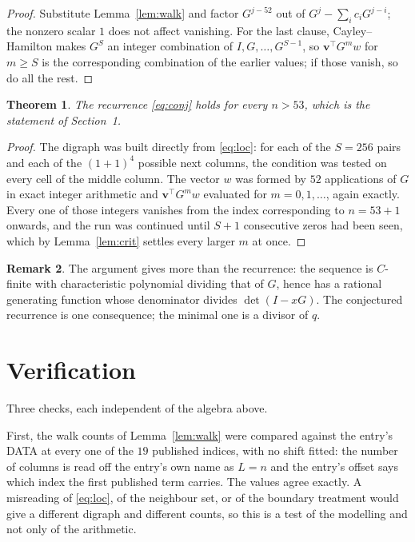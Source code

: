 \documentclass[11pt,a4paper]{article}
\theoremstyle{plain}
\newtheorem{theorem}{Theorem}
\theoremstyle{definition}
\newtheorem{remark}[theorem]{Remark}
\begin{document}
\begin{proof}
Substitute Lemma~\ref{lem:walk} and factor $G^{j-52}$ out of
$G^{j}-\sum_ic_iG^{j-i}$; the nonzero scalar $1$ does not affect
vanishing. For the last clause, Cayley--Hamilton makes $G^{S}$ an integer combination of
$I,G,\dots,G^{S-1}$, so $\mathbf{v}^{\!\top}G^{m}w$ for $m\ge S$ is the corresponding
combination of the earlier values; if those vanish, so do all the rest.
\end{proof}

\begin{theorem}
The recurrence \eqref{eq:conj} holds for every $n>53$, which is the statement of
Section~1.
\end{theorem}

\begin{proof}
The digraph was built directly from \eqref{eq:loc}: for each of the $S=256$ pairs and each
of the $(1+1)^{4}$ possible next columns, the condition was tested on every cell of
the middle column. The vector $w$ was formed by $52$ applications of $G$ in exact integer
arithmetic and $\mathbf{v}^{\!\top}G^{m}w$ evaluated for $m=0,1,\dots$, again exactly.
Every one of those integers vanishes from the index corresponding to $n=53+1$ onwards,
and the run was continued until $S+1$ consecutive zeros had been seen, which by
Lemma~\ref{lem:crit} settles every larger $m$ at once.
\end{proof}

\begin{remark}
The argument gives more than the recurrence: the sequence is $C$-finite with characteristic
polynomial dividing that of $G$, hence has a rational generating function whose denominator
divides $\det(I-xG)$. The conjectured recurrence is one consequence; the minimal one is a
divisor of $q$.
\end{remark}

\section{Verification}

Three checks, each independent of the algebra above.

First, the walk counts of Lemma~\ref{lem:walk} were compared against the entry's DATA at
every one of the $19$ published indices, with no shift fitted: the number of columns is
read off the entry's own name as $L=n$ and the entry's offset says which index the first
published term carries. The values agree exactly. A misreading of \eqref{eq:loc}, of the
neighbour set, or of the boundary treatment would give a different digraph and different
counts, so this is a test of the modelling and not only of the arithmetic.
\end{document}
